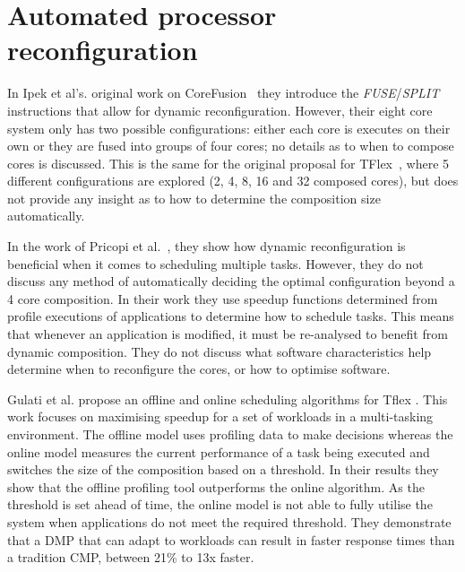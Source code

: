 \section{Automated processor reconfiguration}

In Ipek et al's. original work on CoreFusion~\cite{ipek2007CoreFusion} they introduce the \textit{FUSE}/\textit{SPLIT} instructions that allow for dynamic reconfiguration.
However, their eight core system only has two possible configurations: either each core is executes on their own or they are fused into groups of four cores; no details as to when to compose cores is discussed.
This is the same for the original proposal for TFlex~\cite{kim2007tflex}, where 5 different configurations are explored (2, 4, 8, 16 and 32 composed cores), but does not provide any insight as to how to determine the composition size automatically.

In the work of Pricopi et al.~\cite{pricopiSchedCoreComp2014}, they show how dynamic reconfiguration is beneficial when it comes to scheduling multiple tasks.
However, they do not discuss any method of automatically deciding the optimal configuration beyond a 4 core composition.
In their work they use speedup functions determined from profile executions of applications to determine how to schedule tasks.
This means that whenever an application is modified, it must be re-analysed to benefit from dynamic composition.
They do not discuss what software characteristics help determine when to reconfigure the cores, or how to optimise software.

Gulati et al. propose an offline and online scheduling algorithms for Tflex \cite{gulati2008multitaskingdmc}. 
This work focuses on maximising speedup for a set of workloads in a multi-tasking environment.
The offline model uses profiling data to make decisions whereas the online model measures the current performance of a task being executed and switches the size of the composition based on a threshold.
In their results they show that the offline profiling tool outperforms the online algorithm.
As the threshold is set ahead of time, the online model is not able to fully utilise the system when applications do not meet the required threshold.
They demonstrate that a DMP that can adapt to workloads can result in faster response times than a tradition CMP, between 21\% to 13x faster.


